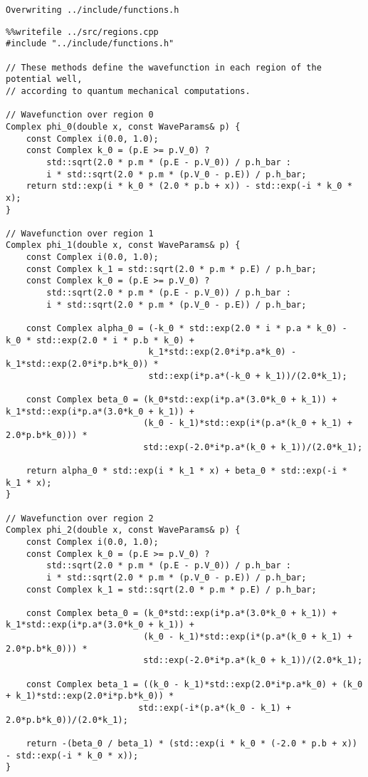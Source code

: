 \documentclass[11pt]{article}
\begin{document}
\label{orgab06287}
\begin{verbatim}
Overwriting ../include/functions.h
\end{verbatim}

\begin{verbatim}
%%writefile ../src/regions.cpp
#include "../include/functions.h"

// These methods define the wavefunction in each region of the potential well,
// according to quantum mechanical computations.

// Wavefunction over region 0
Complex phi_0(double x, const WaveParams& p) {
    const Complex i(0.0, 1.0);
    const Complex k_0 = (p.E >= p.V_0) ?
        std::sqrt(2.0 * p.m * (p.E - p.V_0)) / p.h_bar :
        i * std::sqrt(2.0 * p.m * (p.V_0 - p.E)) / p.h_bar;
    return std::exp(i * k_0 * (2.0 * p.b + x)) - std::exp(-i * k_0 * x);
}

// Wavefunction over region 1
Complex phi_1(double x, const WaveParams& p) {
    const Complex i(0.0, 1.0);
    const Complex k_1 = std::sqrt(2.0 * p.m * p.E) / p.h_bar;
    const Complex k_0 = (p.E >= p.V_0) ?
        std::sqrt(2.0 * p.m * (p.E - p.V_0)) / p.h_bar :
        i * std::sqrt(2.0 * p.m * (p.V_0 - p.E)) / p.h_bar;

    const Complex alpha_0 = (-k_0 * std::exp(2.0 * i * p.a * k_0) - k_0 * std::exp(2.0 * i * p.b * k_0) +
                            k_1*std::exp(2.0*i*p.a*k_0) - k_1*std::exp(2.0*i*p.b*k_0)) *
                            std::exp(i*p.a*(-k_0 + k_1))/(2.0*k_1);

    const Complex beta_0 = (k_0*std::exp(i*p.a*(3.0*k_0 + k_1)) + k_1*std::exp(i*p.a*(3.0*k_0 + k_1)) +
                           (k_0 - k_1)*std::exp(i*(p.a*(k_0 + k_1) + 2.0*p.b*k_0))) *
                           std::exp(-2.0*i*p.a*(k_0 + k_1))/(2.0*k_1);

    return alpha_0 * std::exp(i * k_1 * x) + beta_0 * std::exp(-i * k_1 * x);
}

// Wavefunction over region 2
Complex phi_2(double x, const WaveParams& p) {
    const Complex i(0.0, 1.0);
    const Complex k_0 = (p.E >= p.V_0) ?
        std::sqrt(2.0 * p.m * (p.E - p.V_0)) / p.h_bar :
        i * std::sqrt(2.0 * p.m * (p.V_0 - p.E)) / p.h_bar;
    const Complex k_1 = std::sqrt(2.0 * p.m * p.E) / p.h_bar;

    const Complex beta_0 = (k_0*std::exp(i*p.a*(3.0*k_0 + k_1)) + k_1*std::exp(i*p.a*(3.0*k_0 + k_1)) +
                           (k_0 - k_1)*std::exp(i*(p.a*(k_0 + k_1) + 2.0*p.b*k_0))) *
                           std::exp(-2.0*i*p.a*(k_0 + k_1))/(2.0*k_1);

    const Complex beta_1 = ((k_0 - k_1)*std::exp(2.0*i*p.a*k_0) + (k_0 + k_1)*std::exp(2.0*i*p.b*k_0)) *
                          std::exp(-i*(p.a*(k_0 - k_1) + 2.0*p.b*k_0))/(2.0*k_1);

    return -(beta_0 / beta_1) * (std::exp(i * k_0 * (-2.0 * p.b + x)) - std::exp(-i * k_0 * x));
}
\end{verbatim}
\end{document}
